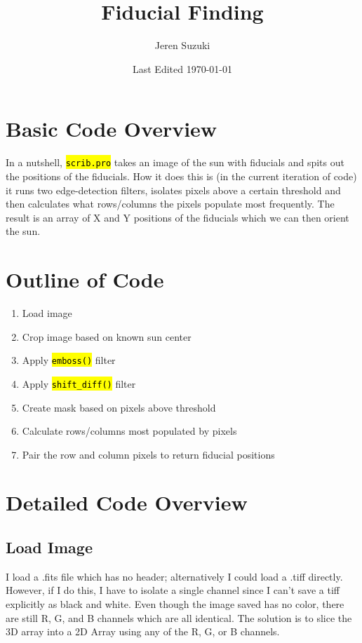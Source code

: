 \documentclass[10pt]{scrartcl}
\title{Fiducial Finding}
\author{Jeren Suzuki}
\date{Last Edited \today}
\begin{document}
\maketitle
{}
\tableofcontents
\clearpage
{}

\section{Basic Code Overview}
In a nutshell, \hl{\tt{scrib.pro}} takes an image of the sun with fiducials and spits out the positions of the fiducials. How it does this is (in the current iteration of code) it runs two edge-detection filters, isolates pixels above a certain threshold and then calculates what rows/columns the pixels populate most frequently. The result is an array of X and Y positions of the fiducials which we can then orient the sun. 

\section{Outline of Code}
\begin{enumerate}
    \item Load image
    \item Crop image based on known sun center
    \item Apply \hl{\texttt{emboss()}} filter
    \item Apply \hl{\texttt{shift\_diff()}} filter
    \item Create mask based on pixels above threshold
    \item Calculate rows/columns most populated by pixels
    \item Pair the row and column pixels to return fiducial positions
\end{enumerate}

\section{Detailed Code Overview}
    \subsection{Load Image} %
    \label{sub:load_image}
    I load a .fits file which has no header; alternatively I could load a .tiff directly. However, if I do this, I have to isolate a single channel since I can't save a tiff explicitly as black and white. Even though the image saved has no color, there are still R, G, and B channels which are all identical. The solution is to slice the 3D array into a 2D Array using any of the R, G, or B channels.
\end{document}
